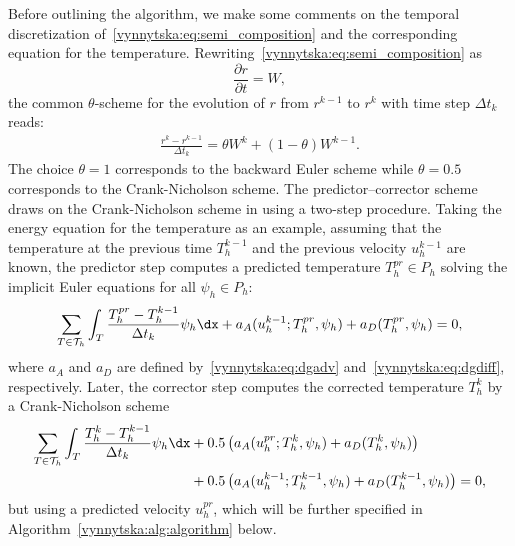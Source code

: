 Before outlining the algorithm, we make some comments on the temporal
discretization of~\eqref{vynnytska:eq:semi_composition} and the
corresponding equation for the
temperature. Rewriting~\eqref{vynnytska:eq:semi_composition} as
\begin{equation}
  \frac{\partial r}{\partial t} = W,
\end{equation}
the common $\theta$-scheme for the evolution of $r$ from $r^{k-1}$ to
$r^k$ with time step $\Delta t_k$ reads:
\begin{align}
  \label{vynnytska:eq:thetascheme}
  \frac{r^k - r^{k-1}}{\Delta t_k} = \theta W^k + (1 - \theta) W^{k-1}.
\end{align}
The choice $\theta = 1$ corresponds to the backward Euler scheme while
$\theta = 0.5$ corresponds to the Crank-Nicholson scheme. The
predictor--corrector scheme draws on the Crank-Nicholson scheme in
using a two-step procedure. Taking the energy equation for the
temperature as an example, assuming that the temperature at the
previous time $T_h^{k-1}$ and the previous velocity $u_h^{k-1}$ are
known, the predictor step computes a predicted temperature $T_h^{pr}
\in P_h$ solving the implicit Euler equations for all $\psi_h \in
P_h$:
\begin{equation}
  \label{vynnytska:eq:predictor}
  \sum_{T \in \mathcal{T}_h}
  \int_T \frac{T_h^{pr} - T_h^{k-1}}{\Delta t_k} \psi_h \dx
  + a_{A} (u_h^{k-1}; T_h^{pr}, \psi_h) + a_D (T_h^{pr}, \psi_h) = 0,
\end{equation}
where $a_A$ and $a_D$ are defined by~\eqref{vynnytska:eq:dgadv}
and~\eqref{vynnytska:eq:dgdiff}, respectively. Later, the corrector
step computes the corrected temperature $T_h^k$ by a Crank-Nicholson
scheme
\begin{equation}
  \label{vynnytska:eq:corrector}
  \begin{split}
    \sum_{T \in \mathcal{T}_h}
    \int_T \frac{T_h^k - T_h^{k-1}}{\Delta t_k} \psi_h \dx
    &+ 0.5 \left( a_{A} (u_h^{pr}; T_h^{k}, \psi_h)
    + a_D (T_h^{k}, \psi_h) \right) \\
    &+ 0.5 \left( a_{A} (u_h^{k-1}; T_h^{k-1}, \psi_h)
    + a_D (T_h^{k-1}, \psi_h) \right) = 0,
  \end{split}
\end{equation}
but using a predicted velocity $u_h^{pr}$, which will be further
specified in Algorithm~\ref{vynnytska:alg:algorithm}
below.
